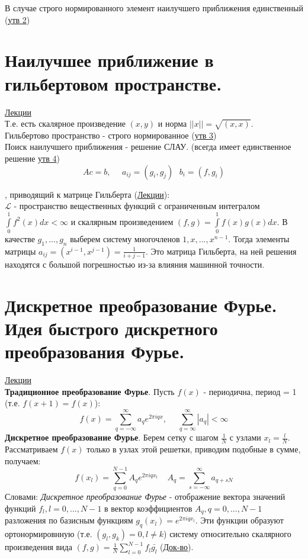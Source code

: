 \documentclass[specialist, subf, href, colorlinks=true, 12pt, times, mtpro, final]{disser}
\theoremstyle{definition}
\begin{document}
    В случае строго нормированного элемент наилучшего приближения единственный (\hyperlink {lects.29}{утв 2})

\section {Наилучшее приближение в гильбертовом пространстве.}
    \hyperlink {lects.29}{Лекции}\\
    Т.е. есть скалярное произведение $(x,y)$ и норма $||x||=\sqrt{(x,x)}$. \\
    Гильбертово пространство - строго нормированное (\hyperlink {lects.29}{утв 3}) \\
    
    Поиск наилучшего приближения - решение СЛАУ. (всегда имеет единственное решение \hyperlink {lects.30}{утв 4})
    $$
        Ac = b, \ \ \ \ \ \ a_{ij} = (g_i, g_j) \ \ \ b_i = (f, g_i)
    $$
    
    , приводящий к матрице Гильберта (\hyperlink{lects.31}{Лекции}):\\
    $\mathcal{L}$ - пространство вещественных функций с ограниченным интегралом $\int\limits_0^1 f^2(x)dx < \infty $ и скалярным произведением $(f,g) = \int\limits_0^1 f(x)g(x)dx$. В качестве $g_1, ..., g_n$ выберем систему многочленов $1, x, ..., x^{n-1}$. Тогда элементы матрицы $a_{ij} = (x^{i-1},x^{j-1}) = \frac{1}{i+j-1}$. Это матрица Гильберта, на ней решения находятся с большой погрешностью из-за влияния машинной точности. 

\section {Дискретное преобразование Фурье. Идея быстрого дискретного преобразования Фурье.}
    \hyperlink {lects.32}{Лекции}\\
    \textbf{Традиционное преобразование Фурье}. Пусть $f(x)$ - периодична, период = 1 (т.е. $f(x+1) = f(x)$):
    $$
        f(x) = \sum\limits_{q = -\infty}^{\infty} a_q e^{2\pi i qx},  \ \ \  \ \ \ \sum\limits_{q = \infty}^{\infty}|a_q| < \infty
    $$
    \textbf{Дискретное преобразование Фурье}. Берем сетку с шагом $\frac{1}{N}$ с узлами $x_l = \frac{l}{N}$. Рассматриваем $f(x)$ только в узлах этой решетки, приводим подобные в сумме, получаем:
    $$
        f(x_l) = \sum\limits_{q = 0}^{N-1} A_q e^{2\pi i qx_l} \ \ \ \ \ A_q = \sum\limits_{s = - \infty}^{\infty} a_{q+sN}
    $$
    Словами: \textit{Дискретное преобразование Фурье} - отображение вектора значений функций $f_l, l = 0, ..., N-1$ в вектор коэффициентов $A_q, q = 0, ..., N-1$ разложения по базисным функциям $g_q(x_l) = e^{2\pi i qx_l}$. Эти функции образуют ортонормировнную (т.е. $(g_l,g_k) = 0, l \ne k$) систему относительно скалярного произведения вида $(f,g) = \frac{1}{N}\sum\limits_{l = 0}^{N-1}f_l \bar{g_l}$ (\hyperlink {lects.32}{Док-во}). 
    
\end{document}
